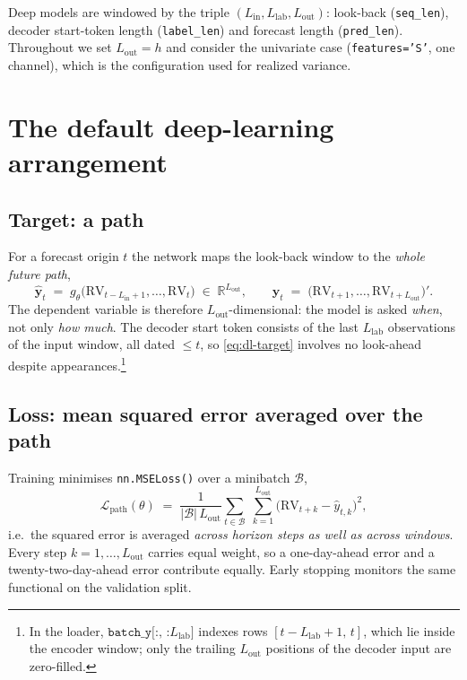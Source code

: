\documentclass[11pt,a4paper]{article}
\newcommand{\RV}{\mathrm{RV}}
\newcommand{\Lpath}{\mathcal{L}_{\mathrm{path}}}
\newcommand{\Lin}{L_{\mathrm{in}}}
\newcommand{\Llab}{L_{\mathrm{lab}}}
\newcommand{\Lout}{L_{\mathrm{out}}}
\begin{document}
Deep models are windowed by the triple $(\Lin,\Llab,\Lout)$: look-back (\texttt{seq\_len}),
decoder start-token length (\texttt{label\_len}) and forecast length (\texttt{pred\_len}).
Throughout we set $\Lout=h$ and consider the univariate case
(\texttt{features='S'}, one channel), which is the configuration used for realized variance.

\section{The default deep-learning arrangement}
\label{sec:dl-default}

\subsection{Target: a path}

For a forecast origin $t$ the network maps the look-back window to the \emph{whole future
path},
\begin{equation}
  \hat{\bm{y}}_{t} \;=\; g_\theta\bigl(\RV_{t-\Lin+1},\dots,\RV_{t}\bigr)
  \;\in\; \mathbb{R}^{\Lout},
  \qquad
  \bm{y}_{t} \;=\; \bigl(\RV_{t+1},\dots,\RV_{t+\Lout}\bigr)' .
  \label{eq:dl-target}
\end{equation}
The dependent variable is therefore $\Lout$-dimensional: the model is asked \emph{when},
not only \emph{how much}. The decoder start token consists of the last $\Llab$ observations
of the input window, all dated $\le t$, so \eqref{eq:dl-target} involves no look-ahead
despite appearances.\footnote{In the loader, $\texttt{batch\_y[:, :}\Llab\texttt{]}$ indexes
rows $[t-\Llab+1,\,t]$, which lie inside the encoder window; only the trailing $\Lout$
positions of the decoder input are zero-filled.}

\subsection{Loss: mean squared error averaged over the path}

Training minimises \texttt{nn.MSELoss()} over a minibatch $\mathcal{B}$,
\begin{equation}
  \Lpath(\theta)
  \;=\;
  \frac{1}{|\mathcal{B}|\,\Lout}
  \sum_{t\in\mathcal{B}}\;\sum_{k=1}^{\Lout}
  \bigl(\RV_{t+k}-\hat{y}_{t,k}\bigr)^{2},
  \label{eq:dl-loss}
\end{equation}
i.e.\ the squared error is averaged \emph{across horizon steps as well as across windows}.
Every step $k=1,\dots,\Lout$ carries equal weight, so a one-day-ahead error and a
twenty-two-day-ahead error contribute equally. Early stopping monitors the same functional
on the validation split.
\end{document}
